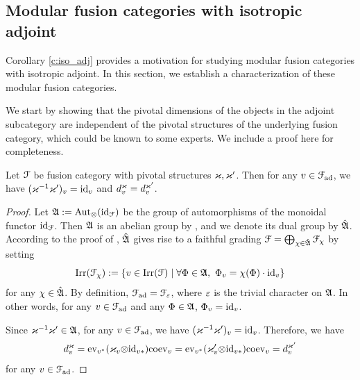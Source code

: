 \documentclass[11pt]{article}
\begin{document}
\subsection{Modular fusion categories with isotropic adjoint}\label{subsec:g=2}
Corollary \ref{c:iso_adj} provides a motivation for studying modular fusion categories with isotropic adjoint. In this section, we establish a characterization of these modular fusion categories. 


We start by showing that the pivotal dimensions of the objects in the adjoint subcategory are independent of the pivotal structures of the underlying fusion category, which could be known to some experts. We include a proof here for completeness. 

\begin{lemma}\label{lem:j-ad}
Let $\mathcal{F}$ be fusion category with pivotal structures $\varkappa, \varkappa'$. Then for any $v \in \mathcal{F}_{{\operatorname{ad}}}$, we have $(\varkappa^{-1}\varkappa')_v = {\operatorname{id}}_v$ and $d^\varkappa_v = d^{\varkappa'}_v$.
\end{lemma}
\begin{proof}
Let $\mathfrak{A} := {\operatorname{Aut}}_{{\otimes}}({\operatorname{id}}_{\mathcal{F}})$ be the group of automorphisms of the monoidal functor ${\operatorname{id}}_{\mathcal{F}}$. Then $\mathfrak{A}$ is an abelian group by \cite{GN08}, and we denote its dual group by $\hat{\mathfrak{A}}$. According to the proof of \cite[Prop.~3.9]{GN08}, $\hat{\mathfrak{A}}$ gives rise to a faithful grading $\mathcal{F} = \bigoplus_{\chi\in \hat{\mathfrak{A}}} \mathcal{F}_\chi$ by setting
\[
{\operatorname{Irr}}(\mathcal{F}_\chi) := \{v \in {\operatorname{Irr}}(\mathcal{F}) \mid \forall \Phi \in \mathfrak{A},\ \Phi_v = \chi(\Phi) \cdot{\operatorname{id}}_v\}
\]
for any $\chi \in \hat{\mathfrak{A}}$. By definition, $\mathcal{F}_{\operatorname{ad}} = \mathcal{F}_{\varepsilon}$, where ${\varepsilon}$ is the trivial character on $\mathfrak{A}$. In other words, for any $v \in \mathcal{F}_{\operatorname{ad}}$ and any $\Phi\in \mathfrak{A}$, $\Phi_v = {\operatorname{id}}_v$.

Since $\varkappa^{-1}\varkappa' \in \mathfrak{A}$, for any $v \in \mathcal{F}_{\operatorname{ad}}$, we have $(\varkappa^{-1}\varkappa')_v = {\operatorname{id}}_v$. Therefore, we have
\[
d^\varkappa_v =  {\operatorname{ev}}_{v^*}(\varkappa_v {\otimes} {\operatorname{id}}_{v*}){\operatorname{coev}}_v
= {\operatorname{ev}}_{v^*}(\varkappa'_v {\otimes} {\operatorname{id}}_{v*}){\operatorname{coev}}_v = d^{\varkappa'}_v
\]
for any $v \in \mathcal{F}_{\operatorname{ad}}$.
\end{proof}
\end{document}
